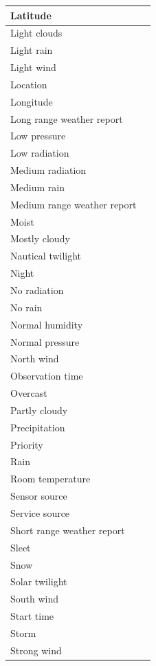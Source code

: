 \begin{longtable}{|p{}|p{}|}
  \hline
  Latitude & \\
  \hline
  Light clouds & \\
  \hline
  Light rain & \\
  \hline
  Light wind & \\
  \hline
  Location & \\
  \hline
  Longitude & \\
  \hline
  Long range weather report & \\
  \hline
  Low pressure & \\
  \hline
  Low radiation & \\
  \hline
  Medium radiation & \\
  \hline
  Medium rain & \\
  \hline
  Medium range weather report & \\
  \hline
  Moist & \\
  \hline
  Mostly cloudy & \\
  \hline
  Nautical twilight & \\
  \hline
  Night & \\
  \hline
  No radiation & \\
  \hline
  No rain & \\
  \hline
  Normal humidity & \\
  \hline
  Normal pressure & \\
  \hline
  North wind & \\
  \hline
  Observation time & \\
  \hline
  Overcast & \\
  \hline
  Partly cloudy & \\
  \hline
  Precipitation & \\
  \hline
  Priority & \\
  \hline
  Rain & \\
  \hline
  Room temperature & \\
  \hline
  Sensor source & \\
  \hline
  Service source & \\
  \hline
  Short range weather report & \\
  \hline
  Sleet & \\
  \hline
  Snow & \\
  \hline
  Solar twilight & \\
  \hline
  South wind & \\
  \hline
  Start time & \\
  \hline
  Storm & \\
  \hline
  Strong wind & \\

\end{longtable}
